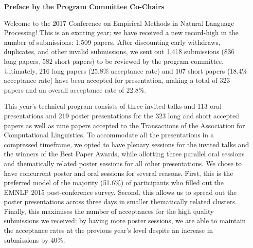 \documentclass[11pt]{article}
\begin{document}
\begin{center}
  {\Large \bf Preface by the Program Committee Co-Chairs}
\end{center}



\setlength{\parskip}{.7ex}

Welcome to the 2017 Conference on Empirical Methods in Natural Language Processing! This is an exciting year; we have received a new record-high in the number of submissions: 1,509 papers. After discounting early withdraws, duplicates, and other invalid submissions, we sent out 1,418 submissions (836 long papers, 582 short papers) to be reviewed by the program committee. Ultimately, 216 long papers (25.8\% acceptance rate) and 107 short papers (18.4\% acceptance rate) have been accepted for presentation, making a total of 323 papers and an overall acceptance rate of 22.8\%. 

This year’s technical program consists of three invited talks and 113 oral presentations and 219 poster presentations for the 323 long and short accepted papers as well as nine papers accepted to the Transactions of the Association for Computational Linguistics. To accommodate all the presentations in a compressed timeframe, we opted to have plenary sessions for the invited talks and the winners of the Best Paper Awards, while allotting three parallel oral sessions and thematically related poster sessions for all other presentations. We chose to have concurrent poster and oral sessions for several reasons. First, this is the preferred model of the majority (51.6\%) of participants who filled out the EMNLP 2015 post-conference survey. Second, this allows us to spread out the poster presentations across three days in smaller thematically related clusters. Finally, this maximises the number of acceptances for the high quality submissions we received; by having more poster sessions, we are able to maintain the acceptance rates at the previous year’s level despite an increase in submissions by 40\%. 
\end{document}
